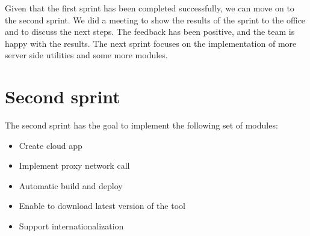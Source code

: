 Given that the first sprint has been completed successfully, we can move on to the second sprint. We did a meeting to show the results of the sprint to the office and to discuss the next steps. The feedback has been positive, and the team is happy with the results. The next sprint focuses on the implementation of more server side utilities and some more modules.

\section{Second sprint}

The second sprint has the goal to implement the following set of modules:

\begin{itemize}
  \item Create cloud app
  \item Implement proxy network call
  \item Automatic build and deploy
  \item Enable to download latest version of the tool
  \item Support internationalization
\end{itemize}


